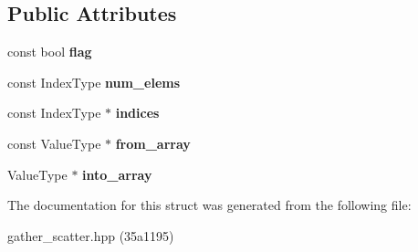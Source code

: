 \subsection*{Public Attributes}
\begin{DoxyCompactItemize}
\item 
\mbox{\label{structGatherScatter_ae0a023c43a44d3398c337759f73c450a}} 
const bool {\bfseries flag}
\item 
\mbox{\label{structGatherScatter_a7a77a08c144b7640c2e595ffcb95e9f6}} 
const Index\+Type {\bfseries num\+\_\+elems}
\item 
\mbox{\label{structGatherScatter_acfd3e8f7792e7e8d84558210c80feb8d}} 
const Index\+Type $\ast$ {\bfseries indices}
\item 
\mbox{\label{structGatherScatter_adbdf8c559625f452f62843c36a629993}} 
const Value\+Type $\ast$ {\bfseries from\+\_\+array}
\item 
\mbox{\label{structGatherScatter_a389b25cdf1bee5084d19f6df1ea53937}} 
Value\+Type $\ast$ {\bfseries into\+\_\+array}
\end{DoxyCompactItemize}


The documentation for this struct was generated from the following file\+:\begin{DoxyCompactItemize}
\item 
gather\+\_\+scatter.\+hpp (35a1195)\end{DoxyCompactItemize}
